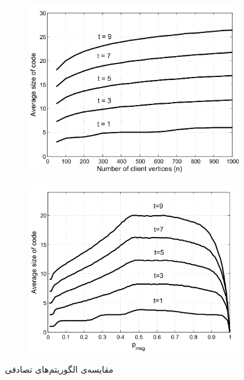 \begin{figure}
\begin{subfigure}[b]{0.45\textwidth}
			\caption{}
			\label{fig:pliable2015b}
		\end{subfigure}
		\\
		\begin{subfigure}[b]{0.45\textwidth}
			\centering
			\includegraphics[width=\textwidth]{figs/ch3/pliable2015_c}
			\caption{}
			\label{fig:pliable2015c}
		\end{subfigure}
		\hfill
		\begin{subfigure}[b]{0.45\textwidth}
			\centering
			\includegraphics[width=\textwidth]{figs/ch3/pliable2015_d}
			\caption{}
			\label{fig:pliable2015d}
		\end{subfigure}
		  	\caption[
		  	مقایسه‌ی الگوریتم‌های تصادفی
		  	]{
		  		مقایسه‌ی الگوریتم‌های تصادفی
		  		\cite{pliable2015paper}
		  		}
		\label{fig:pliable2015}
  \end{figure}

